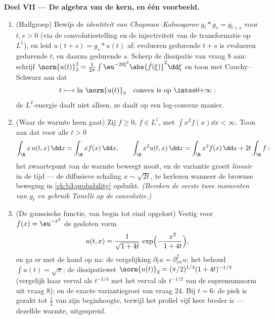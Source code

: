 \begin{problem}[{Weekendopgave --- $\partial_tu =
\partial^2_{xx}u$, van begin tot eind opgelost}]
\medskip
\noindent\textbf{Deel VII --- De algebra van de kern, en één
 voorbeeld.}
\begin{enumerate}[resume]
  \item (Halfgroep) Bewijs de \emph{identiteit van
        Chapman--Kolmogorov} $g_t * g_s = g_{t+s}$ voor $t, s >
        0$ (via de convolutiestelling en de injectiviteit van de
        transformatie op $L^1$), en leid $u(t + s) = g_s * u(t)$
        af: evolueren gedurende $t + s$ is evolueren gedurende
        $t$, en daarna gedurende $s$. Scherp de dissipatie van
        vraag 8 aan: schrijf $\norm{u(t)}_2^2 = \frac1{2\pi}\int
        \eu^{-2t\xi^2}\abs{\hat f(\xi)}^2\dd\xi$ en toon met
        Cauchy--Schwarz aan dat
        \[
        t \longmapsto \ln\,\norm{u(t)}_2
        \quad\text{convex is op } \intoo0{+\infty} :
        \]
        de $L^2$-energie daalt niet alleen, ze daalt op een
        log-convexe manier.
  \item (Waar de warmte heen gaat) Zij $f \geq 0$, $f \in L^1$,
        met $\int x^2f(x)\dd x < \infty$. Toon aan dat voor alle
        $t > 0$
        \[
        \int_\R x\,u(t, x)\,\dd x = \int_\R x f(x)\,\dd x,
        \qquad
        \int_\R x^2u(t, x)\,\dd x
        = \int_\R x^2f(x)\,\dd x + 2t\int_\R f :
        \]
        het zwaartepunt van de warmte beweegt nooit, en de
        variantie groeit \emph{lineair} in de tijd --- de
        diffusieve schaling $x \sim \sqrt{2t}$, te herlezen
        wanneer de brownse beweging in
        \cref{ch:b3:probability} opduikt. \emph{(Bereken de
        eerste twee momenten van $g_t$ en gebruik Tonelli op de
        convolutie.)}
  \item (De gaussische functie, van begin tot eind opgelost)
        Vestig voor $f(x) = \eu^{-x^2}$ de gesloten vorm
        \[
        u(t, x) = \frac1{\sqrt{1 + 4t}}\,
        \exp\Bigl(-\frac{x^2}{1 + 4t}\Bigr),
        \]
        en ga er met de hand op na: de vergelijking
        $\partial_tu = \partial^2_{xx}u$; het behoud $\int u(t) =
        \sqrt\pi$; de dissipatiewet $\norm{u(t)}_2 =
        (\pi/2)^{1/4}(1 + 4t)^{-1/4}$ (vergelijk haar verval als
        $t^{-1/4}$ met het verval als $t^{-1/2}$ van de
        supremumnorm uit vraag 8); en de exacte
        variantiegroei van vraag 24. Bij $t = 6$: de piek is
        gezakt tot $\frac15$ van zijn beginhoogte, terwijl het
        profiel vijf keer breder is --- dezelfde warmte,
        uitgespreid.
\end{enumerate}
\end{problem}
